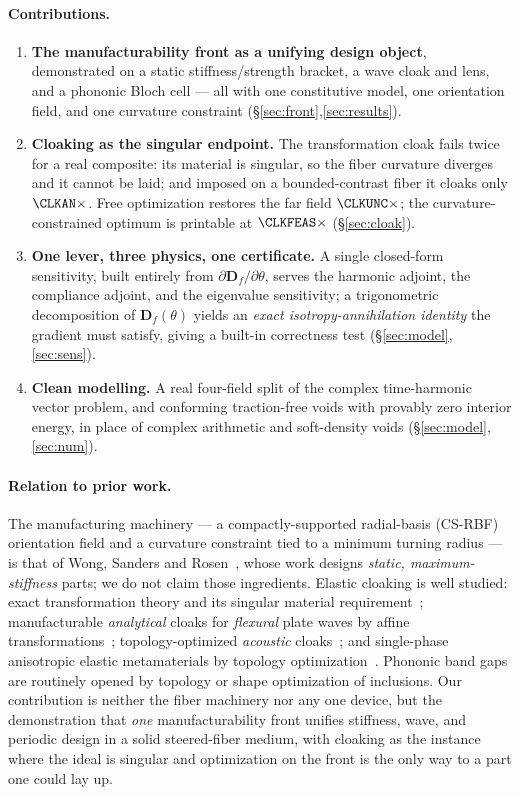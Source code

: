 \documentclass[preprint,11pt]{elsarticle}
\newcommand{\Df}{\mathbf{D}_f}
\theoremstyle{plain}\newtheorem{proposition}{Proposition}
\theoremstyle{remark}\newtheorem{remark}{Remark}
\begin{document}
\paragraph{Contributions.}
\begin{enumerate}\itemsep1pt
\item \textbf{The manufacturability front as a unifying design object}, demonstrated on a
static stiffness/strength bracket, a wave cloak and lens, and a phononic Bloch cell ---
all with one constitutive model, one orientation field, and one curvature constraint
(\S\ref{sec:front},\ref{sec:results}).
\item \textbf{Cloaking as the singular endpoint.} The transformation cloak fails twice for
a real composite: its material is singular, so the fiber curvature diverges and it cannot
be laid; and imposed on a bounded-contrast fiber it cloaks only $\CLKAN\times$. Free
optimization restores the far field $\CLKUNC\times$; the curvature-constrained optimum is
printable at $\CLKFEAS\times$ (\S\ref{sec:cloak}).
\item \textbf{One lever, three physics, one certificate.} A single closed-form
sensitivity, built entirely from $\partial\Df/\partial\theta$, serves the harmonic
adjoint, the compliance adjoint, and the eigenvalue sensitivity; a trigonometric
decomposition of $\Df(\theta)$ yields an \emph{exact isotropy-annihilation identity} the
gradient must satisfy, giving a built-in correctness test (\S\ref{sec:model},\ref{sec:sens}).
\item \textbf{Clean modelling.} A real four-field split of the complex time-harmonic
vector problem, and conforming traction-free voids with provably zero interior energy,
in place of complex arithmetic and soft-density voids (\S\ref{sec:model},\ref{sec:num}).
\end{enumerate}

\paragraph{Relation to prior work.} The manufacturing machinery --- a compactly-supported
radial-basis (CS-RBF) orientation field and a curvature constraint tied to a minimum
turning radius --- is that of Wong, Sanders and Rosen~\cite{wong2025}, whose work designs
\emph{static, maximum-stiffness} parts; we do not claim those ingredients. Elastic
cloaking is well studied: exact transformation theory and its singular material
requirement~\cite{norris2008}; manufacturable \emph{analytical} cloaks for \emph{flexural}
plate waves by affine transformations~\cite{affineCloak}; topology-optimized
\emph{acoustic} cloaks~\cite{toAcoustic}; and single-phase anisotropic elastic
metamaterials by topology optimization~\cite{anisoMeta}. Phononic band gaps are routinely
opened by topology or shape optimization of inclusions. Our contribution is neither the
fiber machinery nor any one device, but the demonstration that \emph{one} manufacturability
front unifies stiffness, wave, and periodic design in a solid steered-fiber medium, with
cloaking as the instance where the ideal is singular and optimization on the front is the
only way to a part one could lay up.
\end{document}
